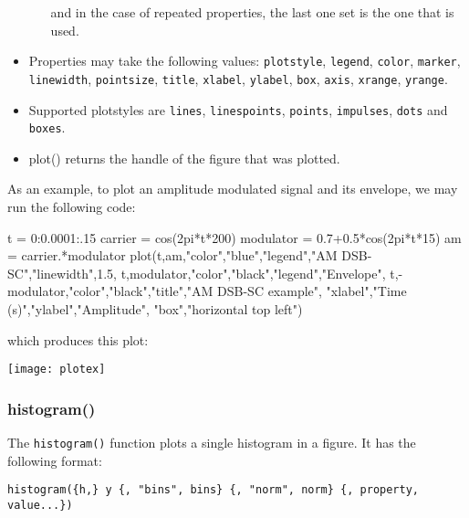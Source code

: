 \documentclass[11pt]{article}
\newcommand{\cmd}[1]{\texttt{#1}}
\begin{document}
\begin{itemize}
\begin{itemize}
				and in the case of repeated properties, the last one set is the
				one that is used.
		\end{itemize}
	\item Properties may take the following values: \cmd{plotstyle},
		\cmd{legend}, \cmd{color},
		\cmd{marker}, \cmd{linewidth}, \cmd{pointsize}, \cmd{title},
		\cmd{xlabel}, \cmd{ylabel}, \cmd{box}, \cmd{axis},
		\cmd{xrange}, \cmd{yrange}.
	\item Supported plotstyles are \cmd{lines}, \cmd{linespoints},
		\cmd{points}, \cmd{impulses}, \cmd{dots} and \cmd{boxes}.
	\item plot() returns the handle of the figure that was plotted.
\end{itemize}

As an example, to plot an amplitude modulated signal and its envelope, we may
run the following code:

\begin{juliacode}
t = 0:0.0001:.15
carrier = cos(2pi*t*200)
modulator = 0.7+0.5*cos(2pi*t*15)
am = carrier.*modulator
plot(t,am,"color","blue","legend","AM DSB-SC","linewidth",1.5,
    t,modulator,"color","black","legend","Envelope",
    t,-modulator,"color","black","title","AM DSB-SC example",
    "xlabel","Time (s)","ylabel","Amplitude",
    "box","horizontal top left")
\end{juliacode}

\noindent which produces this plot:

\begin{center}
\texttt{[image: plotex]}
\end{center}

\subsubsection{histogram()}

The \cmd{histogram()} function plots a single histogram in a figure. It has the
following format:

\cmd{histogram(\{h,\} y \{, "bins", bins\} \{, "norm", norm\}
\{, property, value...\})}
\end{document}
